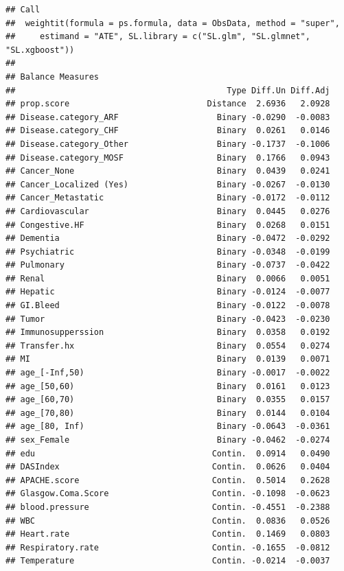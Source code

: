 \documentclass[
]{book}
\begin{document}
\begin{verbatim}
## Call
##  weightit(formula = ps.formula, data = ObsData, method = "super", 
##     estimand = "ATE", SL.library = c("SL.glm", "SL.glmnet", "SL.xgboost"))
## 
## Balance Measures
##                                           Type Diff.Un Diff.Adj
## prop.score                            Distance  2.6936   2.0928
## Disease.category_ARF                    Binary -0.0290  -0.0083
## Disease.category_CHF                    Binary  0.0261   0.0146
## Disease.category_Other                  Binary -0.1737  -0.1006
## Disease.category_MOSF                   Binary  0.1766   0.0943
## Cancer_None                             Binary  0.0439   0.0241
## Cancer_Localized (Yes)                  Binary -0.0267  -0.0130
## Cancer_Metastatic                       Binary -0.0172  -0.0112
## Cardiovascular                          Binary  0.0445   0.0276
## Congestive.HF                           Binary  0.0268   0.0151
## Dementia                                Binary -0.0472  -0.0292
## Psychiatric                             Binary -0.0348  -0.0199
## Pulmonary                               Binary -0.0737  -0.0422
## Renal                                   Binary  0.0066   0.0051
## Hepatic                                 Binary -0.0124  -0.0077
## GI.Bleed                                Binary -0.0122  -0.0078
## Tumor                                   Binary -0.0423  -0.0230
## Immunosupperssion                       Binary  0.0358   0.0192
## Transfer.hx                             Binary  0.0554   0.0274
## MI                                      Binary  0.0139   0.0071
## age_[-Inf,50)                           Binary -0.0017  -0.0022
## age_[50,60)                             Binary  0.0161   0.0123
## age_[60,70)                             Binary  0.0355   0.0157
## age_[70,80)                             Binary  0.0144   0.0104
## age_[80, Inf)                           Binary -0.0643  -0.0361
## sex_Female                              Binary -0.0462  -0.0274
## edu                                    Contin.  0.0914   0.0490
## DASIndex                               Contin.  0.0626   0.0404
## APACHE.score                           Contin.  0.5014   0.2628
## Glasgow.Coma.Score                     Contin. -0.1098  -0.0623
## blood.pressure                         Contin. -0.4551  -0.2388
## WBC                                    Contin.  0.0836   0.0526
## Heart.rate                             Contin.  0.1469   0.0803
## Respiratory.rate                       Contin. -0.1655  -0.0812
## Temperature                            Contin. -0.0214  -0.0037

\end{verbatim}
\end{document}
